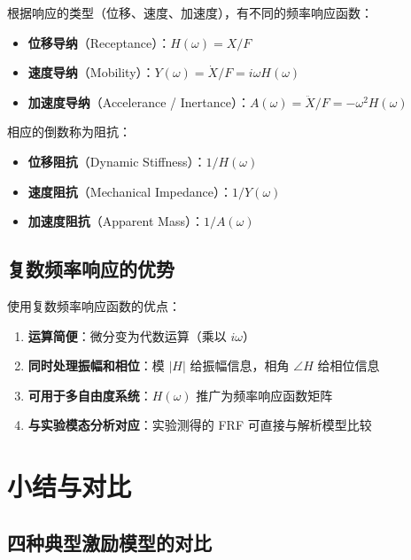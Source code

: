 根据响应的类型（位移、速度、加速度），有不同的频率响应函数：

\begin{itemize}
    \item \textbf{位移导纳}（Receptance）：$H(\omega) = X/F$
    \item \textbf{速度导纳}（Mobility）：$Y(\omega) = \dot{X}/F = i\omega H(\omega)$
    \item \textbf{加速度导纳}（Accelerance / Inertance）：$A(\omega) = \ddot{X}/F = -\omega^2 H(\omega)$
\end{itemize}

相应的倒数称为阻抗：
\begin{itemize}
    \item \textbf{位移阻抗}（Dynamic Stiffness）：$1/H(\omega)$
    \item \textbf{速度阻抗}（Mechanical Impedance）：$1/Y(\omega)$
    \item \textbf{加速度阻抗}（Apparent Mass）：$1/A(\omega)$
\end{itemize}

\subsection{复数频率响应的优势}

使用复数频率响应函数的优点：
\begin{enumerate}
    \item \textbf{运算简便}：微分变为代数运算（乘以 $i\omega$）
    \item \textbf{同时处理振幅和相位}：模 $|H|$ 给振幅信息，相角 $\angle H$ 给相位信息
    \item \textbf{可用于多自由度系统}：$H(\omega)$ 推广为频率响应函数矩阵
    \item \textbf{与实验模态分析对应}：实验测得的 FRF 可直接与解析模型比较
\end{enumerate}

\section{小结与对比}

\subsection{四种典型激励模型的对比}

